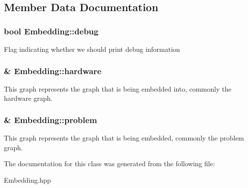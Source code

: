 \subsection{Member Data Documentation}
\subsubsection[{\texorpdfstring{debug}{debug}}]{\setlength{\rightskip}{0pt plus 5cm}bool Embedding\+::debug\hspace{0.3cm}{\ttfamily [protected]}}\hypertarget{a00050_af9fa67f1edc38349bb70e5e78d0f3fbd}{}\label{a00050_af9fa67f1edc38349bb70e5e78d0f3fbd}
Flag indicating whether we should print debug information 
\subsubsection[{\texorpdfstring{hardware}{hardware}}]{\& Embedding\+::hardware\hspace{0.3cm}{\ttfamily [protected]}}\hypertarget{a00050_a511a70c0b460d5baad91794dbc60ab09}{}\label{a00050_a511a70c0b460d5baad91794dbc60ab09}
This graph represents the graph that is being embedded into, commonly the hardware graph. 
\subsubsection[{\texorpdfstring{problem}{problem}}]{\& Embedding\+::problem\hspace{0.3cm}{\ttfamily [protected]}}\hypertarget{a00050_a0ccb9d65884b3ef699699882b2745af9}{}\label{a00050_a0ccb9d65884b3ef699699882b2745af9}
This graph represents the graph that is being embedded, commonly the problem graph. 

The documentation for this class was generated from the following file\+:\begin{DoxyCompactItemize}
\item 
Embedding.\+hpp\end{DoxyCompactItemize}
